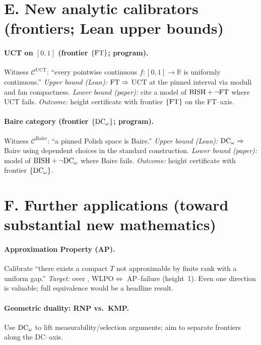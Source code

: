 \documentclass[11pt]{article}
\theoremstyle{definition}
\theoremstyle{remark}
\newcommand{\WLPO}{\mathrm{WLPO}}
\newcommand{\BISH}{\mathrm{BISH}}
\begin{document}
\section{E. New analytic calibrators (frontiers; Lean upper bounds)}

\paragraph{UCT on $[0,1]$ (frontier $\{\mathrm{FT}\}$; program).}
Witness $\mathcal C^{\mathrm{UCT}}$: ``every pointwise continuous $f:[0,1]\to\mathbb R$ is uniformly continuous.''  
\emph{Upper bound (Lean):} $\mathrm{FT}\Rightarrow$ UCT at the pinned interval via moduli and fan compactness.  
\emph{Lower bound (paper):} cite a model of $\BISH+\neg\FT$ where UCT fails.  
\emph{Outcome:} height certificate with frontier $\{\mathrm{FT}\}$ on the FT–axis.

\paragraph{Baire category (frontier $\{\mathrm{DC}_\omega\}$; program).}
Witness $\mathcal C^{\mathrm{Baire}}$: ``a pinned Polish space is Baire.''  
\emph{Upper bound (Lean):} $\mathrm{DC}_\omega\Rightarrow$ Baire using dependent choices in the standard construction.  
\emph{Lower bound (paper):} model of $\BISH+\neg\DCw$ where Baire fails.  
\emph{Outcome:} height certificate with frontier $\{\mathrm{DC}_\omega\}$.

\section{F. Further applications (toward substantial new mathematics)}

\paragraph{Approximation Property (AP).}
Calibrate ``there exists a compact $T$ not approximable by finite rank with a uniform gap.''  
\emph{Target:} over \BISH, $\WLPO \Leftrightarrow$ AP–failure (height~1). Even one direction is valuable; full equivalence would be a headline result.

\paragraph{Geometric duality: RNP vs.\ KMP.}
Use \(\mathrm{DC}_\omega\) to lift measurability/selection arguments; aim to separate frontiers along the DC–axis.
\end{document}
